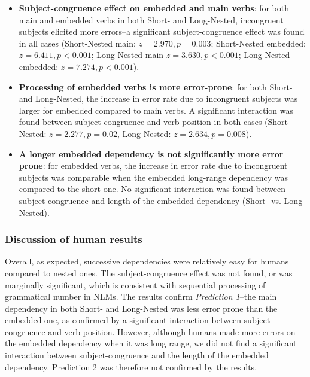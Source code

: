 \begin{itemize}
    \item \textbf{Subject-congruence effect on embedded and main verbs}: for both main and embedded verbs in both Short- and Long-Nested, incongruent subjects elicited more errors--a significant subject-congruence effect was found in all cases (Short-Nested main: $z=2.970, p=0.003$; Short-Nested embedded: $z=6.411, p<0.001$; Long-Nested main $z=3.630, p<0.001$; Long-Nested embedded: $z=7.274, p<0.001$).
    \item \textbf{Processing of embedded verbs is more error-prone}: for both Short- and Long-Nested, the increase in error rate due to incongruent subjects was larger for embedded compared to main verbs. A significant interaction was found between subject congruence and verb position in both cases (Short-Nested: $z=2.277, p = 0.02$, Long-Nested: $z=2.634, p = 0.008$).
    \item \textbf{A longer embedded dependency is not significantly more error prone}: for embedded verbs, the increase in error rate due to incongruent subjects was comparable when the embedded long-range dependency was compared to the short one. No significant interaction was found between subject-congruence and length of the embedded dependency (Short- vs. Long-Nested).
\end{itemize}

\subsubsection{Discussion of human results}
Overall, as expected, successive dependencies were relatively easy for humans compared to nested ones. 
The subject-congruence effect was not found, or was marginally significant, which is consistent with sequential processing of grammatical number in NLMs. The results confirm \textit{Prediction 1}--the main dependency in both Short- and Long-Nested was less error prone than the embedded one, as confirmed by a significant interaction between subject-congruence and verb position. However, although humans made more errors on the embedded dependency when it was long range, we did not find a significant interaction between subject-congruence and the length of the embedded dependency. Prediction 2 was therefore not confirmed by the results.
